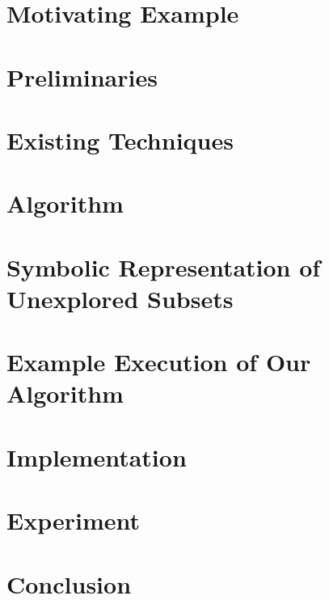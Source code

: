\documentclass{llncs}
\begin{document}
\section{Motivating Example}
\label{sec:mot-example}



\section{Preliminaries}
\label{sec:preliminaries}



\section{Existing Techniques}
\label{sec:existing-techniques}



\section{Algorithm}
\label{sec:algorithm}


\section{Symbolic Representation of Unexplored Subsets}
\label{sec:symbolic-representation}


\section{Example Execution of Our Algorithm}
\label{sec:example-execution}




\section{Implementation}
\label{sec:impl}



\section{Experiment}
\label{sec:experiment}


\section{Conclusion}
\label{sec:conclusions}





\end{document}
